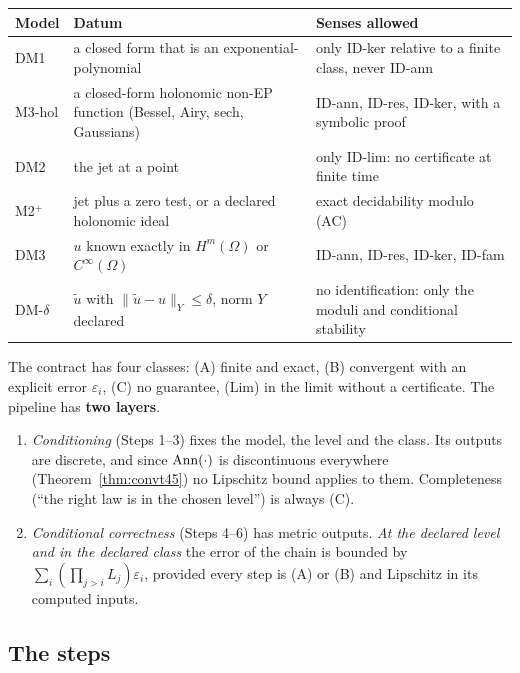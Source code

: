 \begin{center}\small
\begin{tabular}{@{}L{1.9cm}L{4.8cm}L{7.7cm}@{}}
\toprule
Model & Datum & Senses allowed\\\midrule
DM1 & a closed form that is an exponential-polynomial & only ID-ker relative to a finite class, never ID-ann\\
M3-hol & a closed-form holonomic non-EP function (Bessel, Airy, sech, Gaussians) & ID-ann, ID-res, ID-ker, with a symbolic proof\\
DM2 & the jet at a point & only ID-lim: no certificate at finite time\\
M2$^+$ & jet plus a zero test, or a declared holonomic ideal & exact decidability modulo (AC)\\
DM3 & $u$ known exactly in $H^m(\Omega)$ or $C^\infty(\Omega)$ & ID-ann, ID-res, ID-ker, ID-fam\\
DM-$\delta$ & $\tilde u$ with $\|\tilde u-u\|_Y\le\delta$, norm $Y$ declared & no identification: only the moduli and conditional stability\\\bottomrule
\end{tabular}
\end{center}

The contract has four classes: (A) finite and exact, (B) convergent with an explicit error $\varepsilon_i$, (C) no guarantee, (Lim) in the limit without a certificate. The pipeline has \textbf{two layers}.

\begin{enumerate}
\item \emph{Conditioning} (Steps 1--3) fixes the model, the level and the class. Its outputs are discrete, and since $\operatorname{Ann}(\cdot)$ is discontinuous everywhere (Theorem~\ref{thm:convt45}) no Lipschitz bound applies to them. Completeness (``the right law is in the chosen level'') is always (C).
\item \emph{Conditional correctness} (Steps 4--6) has metric outputs. \emph{At the declared level and in the declared class} the error of the chain is bounded by $\sum_i(\prod_{j>i}L_j)\varepsilon_i$, provided every step is (A) or (B) and Lipschitz in its computed inputs.
\end{enumerate}

\subsection{The steps}

